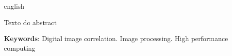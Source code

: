 \documentclass[
	12pt,				%
	oneside,			%
	a4paper,			%
	sumario=abnt-6027-2012, %
	chapter=TITLE, 	%
	english,			%
	french,				%
	spanish,			%
	brazil,				%
	]{abntex2}
\begin{document}
\begin{resumo}[Abstract]
 \begin{otherlanguage*}{english}

Texto do abstract

   \textbf{Keywords}: Digital image correlation. Image processing. High performance computing
 \end{otherlanguage*}
\end{resumo}





\end{document}
